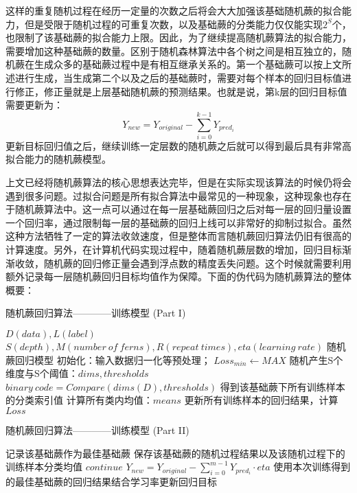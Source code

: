 这样的重复随机过程在经历一定量的次数之后将会大大加强该基础随机蕨的拟合能力，但是受限于随机过程的可重复次数，以及基础蕨的分类能力仅仅能实现$2^S$个，也限制了该基础蕨的拟合能力上限。因此，为了继续提高随机蕨算法的拟合能力，需要增加这种基础蕨的数量。区别于随机森林算法中各个树之间是相互独立的，随机蕨在生成众多的基础蕨过程中是有相互继承关系的。第一个基础蕨可以按上文所述进行生成，当生成第二个以及之后的基础蕨时，需要对每个样本的回归目标值进行修正，修正量就是上层基础随机蕨的预测结果。也就是说，第k层的回归目标值需要更新为：
\begin{equation}
	Y_{new}=Y_{original}-\sum_{i=0}^{k-1} Y_{pred_i}
\end{equation}
更新目标回归值之后，继续训练一定层数的随机蕨之后就可以得到最后具有非常高拟合能力的随机蕨模型。

上文已经将随机蕨算法的核心思想表达完毕，但是在实际实现该算法的时候仍将会遇到很多问题。过拟合问题是所有拟合算法中最常见的一种现象，这种现象也存在于随机蕨算法中。这一点可以通过在每一层基础蕨回归之后对每一层的回归量设置一个回归率，通过限制每一层的基础蕨的回归上线可以非常好的抑制过拟合。虽然这种方法牺牲了一定的算法收敛速度，但是整体而言随机蕨回归算法仍旧有很高的计算速度。另外，在计算机代码实现过程中，随着随机蕨层数的增加，回归目标渐渐收敛，随机蕨的回归修正量会遇到浮点数的精度丢失问题。这个时候就需要利用额外记录每一层随机蕨回归目标均值作为保障。下面的伪代码为随机蕨算法的整体概要：
\newline

\begin{algorithm}
\caption{随机蕨回归算法————训练模型 (Part I)}
\begin{algorithmic}[1]
\Require $D(data), L(label)$
\Require $S(depth), M(number\ of\ ferns), R(repeat\ times), eta(learning\ rate)$
\Ensure 随机蕨回归模型
\State 初始化：输入数据归一化等预处理；
	\State $Loss_{min}\leftarrow MAX$
		\State 随机产生S个维度与S个阈值：$dims, thresholds$
		\State $binary\ code=Compare(dims(D), thresholds)$
		\State \Comment 得到该基础蕨下所有训练样本的分类索引值
		\State 计算所有类内均值：$means$
		\State 更新所有训练样本的回归结果，计算$Loss$
\end{algorithmic}
\end{algorithm}

\begin{algorithm}
\caption*{随机蕨回归算法————训练模型 (Part II)}
\begin{algorithmic}[1]
			\State 记录该基础蕨作为最佳基础蕨
			\State 保存该基础蕨的随机过程结果以及该随机过程下的训练样本分类均值
		\Else 
			\State $continue$
		\EndIf
	\EndFor
	\State $Y_{new}=Y_{original}-\sum_{i=0}^{m-1} Y_{pred_i}\cdot eta$
	\State \Comment 使用本次训练得到的最佳基础蕨的回归结果结合学习率更新回归目标
\EndFor
\end{algorithmic}
\end{algorithm}

